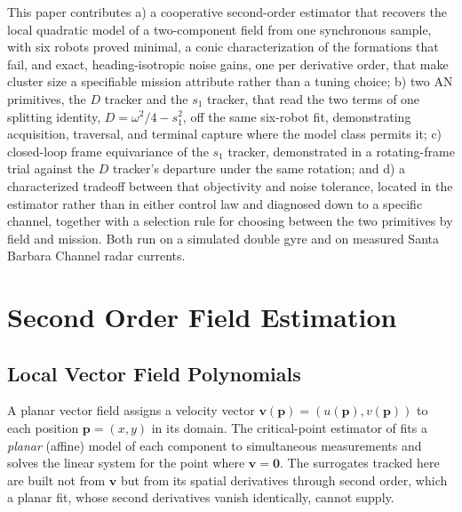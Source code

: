 \documentclass[lettersize,journal]{IEEEtran}
\begin{document}
This paper contributes a) a cooperative second-order estimator that
recovers the local quadratic model of a two-component field from one
synchronous sample, with six robots proved minimal, a conic
characterization of the formations that fail, and exact,
heading-isotropic noise gains, one per derivative order, that make
cluster size a specifiable mission attribute rather than a tuning
choice; b) two AN primitives, the $D$ tracker and the $s_1$ tracker,
that read the two terms of one splitting identity, $D = \omega^2/4 -
s_1^2$, off the same six-robot fit, demonstrating acquisition,
traversal, and terminal capture where the model class permits it;
c) closed-loop frame equivariance of the $s_1$ tracker, demonstrated
in a rotating-frame trial against the $D$ tracker's departure under the
same rotation; and d) a characterized tradeoff between that objectivity
and noise tolerance, located in the estimator rather than in either
control law and diagnosed down to a specific channel, together with a
selection rule for choosing between the two primitives by field and
mission. Both run on a simulated double gyre and on measured Santa
Barbara Channel radar currents.


\section{Second Order Field Estimation}

\subsection{Local Vector Field Polynomials}

A planar vector field assigns a velocity vector $\mathbf{v}(\mathbf{p}) =
(u(\mathbf{p}), v(\mathbf{p}))$ to each position $\mathbf{p} = (x, y)$ in its
domain. The critical-point estimator of \cite{8} fits a \emph{planar}
(affine) model of each component to simultaneous measurements and solves
the linear system for the point where $\mathbf{v} = \mathbf{0}$. The
surrogates tracked here are built not from $\mathbf{v}$ but from its
spatial derivatives through second order, which a planar fit, whose
second derivatives vanish identically, cannot supply.
\end{document}
